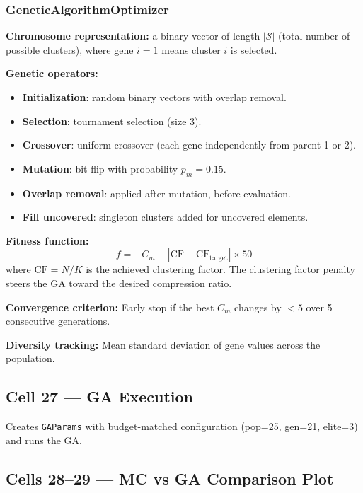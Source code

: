 \documentclass[11pt,a4paper]{article}
\begin{document}
\subsubsection{GeneticAlgorithmOptimizer}

\textbf{Chromosome representation:} a binary vector of length
$|\mathcal{S}|$ (total number of possible clusters), where gene $i = 1$ means
cluster $i$ is selected.

\textbf{Genetic operators:}
\begin{itemize}
    \item \textbf{Initialization}: random binary vectors with overlap removal.
    \item \textbf{Selection}: tournament selection (size 3).
    \item \textbf{Crossover}: uniform crossover (each gene independently from parent 1 or 2).
    \item \textbf{Mutation}: bit-flip with probability $p_m = 0.15$.
    \item \textbf{Overlap removal}: applied after mutation, before evaluation.
    \item \textbf{Fill uncovered}: singleton clusters added for uncovered elements.
\end{itemize}

\textbf{Fitness function:}
\[
    f = -C_m - |\text{CF} - \text{CF}_{\text{target}}| \times 50
\]
where $\text{CF} = N / K$ is the achieved clustering factor.
The clustering factor penalty steers the GA toward the desired compression ratio.

\textbf{Convergence criterion:}
Early stop if the best $C_m$ changes by $< 5$ over 5 consecutive generations.

\textbf{Diversity tracking:}
Mean standard deviation of gene values across the population.

\subsection{Cell 27 --- GA Execution}

Creates \texttt{GAParams} with budget-matched configuration
(pop=25, gen=21, elite=3) and runs the GA.

\subsection{Cells 28--29 --- MC vs GA Comparison Plot}
\end{document}
